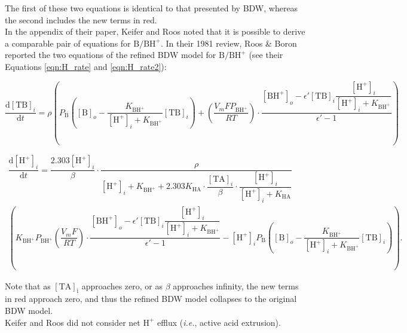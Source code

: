 \documentclass[fleqn,10pt]{physiome}
\begin{document}
The first of these two equations is identical to that presented by BDW, whereas the second includes the new terms in red.\\

In the appendix of their paper, Keifer and Roos noted that it is possible to derive a comparable pair of equations for $\mathrm{B/BH^+}$. In their 1981 review, Roos \& Boron reported the two equations of the refined BDW model for $\mathrm{B/BH^+}$ (see their Equations \ref{eqn:H_rate} and \ref{eqn:H_rate2}): 

\begin{equation*}
\dfrac{\mathrm{d[TB]}_i}{\mathrm{d}t}=\rho\left(P_\mathrm{B}\left( \mathrm{[B]}_o-\dfrac{K_\mathrm{BH^+}}{\mathrm{[H^+]}_i+K_\mathrm{BH^+}}\mathrm{[TB]}_i \right)+\left(\dfrac{V_mFP_\mathrm{BH^+}}{RT}\right)\cdot\dfrac{\mathrm{[BH^+]}_o-\epsilon ' \mathrm{[TB]}_i\dfrac{\mathrm{[H^+]}_i}{\mathrm{[H^+]}_i+K_\mathrm{BH^+}}}{\epsilon '-1} \right)
\label{eqn:keifer3}
\end{equation*}

\begin{multline*}
\dfrac{\mathrm{d[H^+]}_i}{\mathrm{d}t}=\dfrac{2.303\mathrm{[H^+]}_i}{\beta}\cdot \dfrac{\rho}{\mathrm{[H^+]}_i+K_\mathrm{BH^+}+2.303K_\mathrm{HA}\cdot \dfrac{\mathrm{[TA]}_i}{\beta}\cdot \dfrac{\mathrm{[H^+]}_i}{\mathrm{[H^+]}_i+K_\mathrm{HA}}}\\ \left(K_\mathrm{BH^+}P_\mathrm{BH^+}\left(\dfrac{V_mF}{RT}\right)\cdot\dfrac{\mathrm{[BH^+]}_o-\epsilon '\mathrm{[TB]}_i\dfrac{\mathrm{[H^+]}_i}{\mathrm{[H^+]}_i+K_\mathrm{BH^+}}}{\epsilon '-1}-\mathrm{[H^+]}_i P_\mathrm{B}\left(\mathrm{[B]}_o-\dfrac{K_\mathrm{BH^+}}{\mathrm{[H^+]}_i+K_\mathrm{BH^+}}\mathrm{[TB]}_i \right) \right).
\label{eqn:keifer4}
\end{multline*}

Note that as $\mathrm{[TA]_i}$ approaches zero, or as $\beta$ approaches infinity, the new terms in red approach zero, and thus the refined BDW model collapses to the original BDW model.\\

Keifer and Roos did not consider net $\mathrm{H^+}$ efflux (\emph{i.e.}, active acid extrusion).\\
\end{document}
